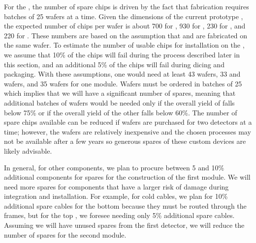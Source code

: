 For the , the number of spare chips is driven by the fact that fabrication
requires batches of 25 wafers at a time. Given the dimensions of the current prototype , the
expected number of chips per wafer is about 700 for , 930 for ,
230 for , and 220 for . These numbers are based on the
assumption that  and  are fabricated on the same wafer. To
estimate the number of usable chips for installation on the , we assume that
10\% of the chips will fail during the  process described later in this section,
and an additional 5\% of the chips will fail during dicing and packaging. With these
assumptions, one would need at least 43  wafers, 33  and 
 wafers, and 35  wafers for one   module. Wafers
must be ordered in batches of 25 which implies that we will have a significant number of
spares, meaning that additional batches of wafers would be needed only if the overall
yield of  falls below 75\% or if the overall yield of the other
 falls below 60\%. The number of spare chips available can be reduced if wafers are purchased for two
 detectors at a time; however, the wafers are relatively inexpensive and the chosen
processes may not be available after a few years so generous spares of these custom devices
are likely advisable. 

In general, for other components, we plan to procure between 5 and
10\% additional components for spares for the construction of the first 
 module. We will need more spares for components that have
a larger risk of damage during integration and 
installation. For example, for cold cables, we
plan for 10\% additional spare cables for the bottom  because
they must be routed through the  frames, but
for the top , we foresee needing only 5\% additional spare cables.
Assuming we will have unused spares from the first detector, we will reduce the number of
spares for the second   module.

